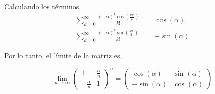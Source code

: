 { 	Calculando los t\'erminos, 
 	\begin{align*}
 		\sum_{k=0}^{\infty} \frac{(-\alpha)^k \cos\left(\frac{k\pi}{2}\right)}{k!} &= \cos(\alpha), \\
 		\sum_{k=0}^{\infty} \frac{(-\alpha)^k \sin\left(\frac{k\pi}{2}\right)}{k!} &= -\sin(\alpha)
 	\end{align*}
 	
 	Por lo tanto, el límite de la matriz es,
 	
 }
  
 
 \begin{LnxRptaBox}
 	\begin{equation*}
 			\lim_{n \to \infty} \left( \begin{array}{cc} 1 & \frac{\alpha}{n} \\ -\frac{\alpha}{n} & 1 \end{array} \right)^n = \begin{pmatrix} \cos(\alpha) & \sin(\alpha) \\ -\sin(\alpha) & \cos(\alpha) \end{pmatrix}
 	\end{equation*}
 \end{LnxRptaBox}
 